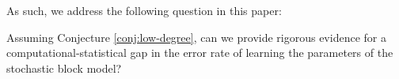 As such, we address the following question in this paper:
\begin{question}
    Assuming Conjecture \ref{conj:low-degree}, can we provide rigorous evidence for a computational-statistical gap in the error rate of learning the parameters of the stochastic block model? 
\end{question}




























 




























